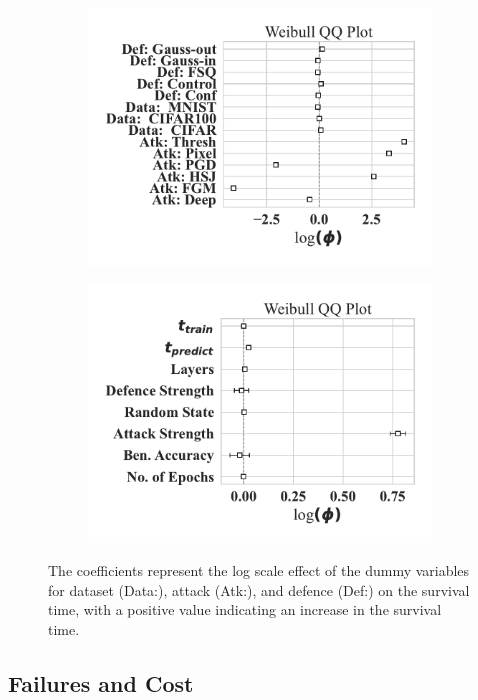 \begin{figure}
    \centering
	\begin{subfigure}
	\centering
    \includegraphics[width=.40\textwidth,trim={25pt 20pt 20pt 10pt},clip]{plots/weibull_aft_dummies.pdf}
    \end{subfigure}
    \begin{subfigure}
	\centering
    \includegraphics[width=.40\textwidth,trim={25pt 20pt 20pt 10pt},clip]{plots/weibull_aft.pdf}
    \label{fig:dummies}
    \end{subfigure}
    \caption{The coefficients represent the log scale effect of the dummy variables for dataset (Data:), attack (Atk:), and defence (Def:) on the survival time, with a positive value indicating an increase in the survival time.}
    \label{fig:covariates}
\end{figure}

\subsection{Failures and Cost}



